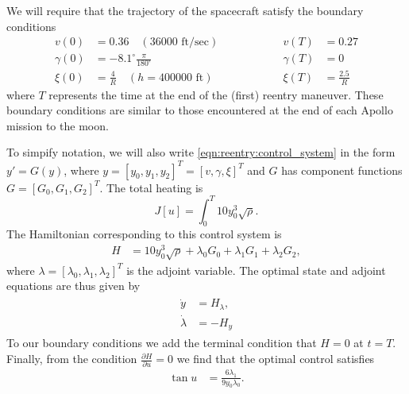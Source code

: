 We will require that the trajectory of the spacecraft satisfy the boundary conditions
\begin{equation}
  \begin{split}
    v(0) &= 0.36 \quad (36000 \text{ ft/sec})\\
    \gamma(0) &= -8.1^\circ \frac{\pi}{180^\circ}\\
    \xi(0)&= \frac{4}{R}\quad (h = 400000 \text{ ft})
  \end{split} 
\quad \quad \quad \quad \quad
  \begin{split}
    v(T) &= 0.27\\
    \gamma(T) &= 0 \\
	\xi(T)&= \frac{2.5}{R}
  \end{split} \label{eqn:reentry:BCs}
\end{equation}
where $T$ represents the time at the end of the (first) reentry maneuver. 
These boundary conditions are similar to those encountered at the end of each Apollo mission to the moon. 

To simpify notation, we will also write \eqref{eqn:reentry:control_system} in the form $y' = G(y)$, where $y = [y_0, y_1, y_2]^T=[v,\gamma, \xi]^T$ and $G$ has component functions $G = [G_0, G_1, G_2]^T$. 
The total heating is 
\[
J[u] = \int_0^T 10y_0^3 \sqrt{\rho}.
\]
The Hamiltonian corresponding to this control system is 
\begin{align}
H &=  10y_0^3 \sqrt{\rho} + \lambda_0G_0 + \lambda_1G_1 + \lambda_2G_2,
\end{align}
where $\lambda = [\lambda_0,\lambda_1,\lambda_2]^T$ is the adjoint variable. 
The optimal state and adjoint equations are thus given by 
\begin{align}
\begin{split}
	\dot{y} &= H_{\lambda},\\
	\dot{\lambda} &= -H_{y} \label{eqn:reentry:full_system}
\end{split}
\end{align}
To our boundary conditions we add the terminal condition that $H = 0$ at $t = T$. 
Finally, from the condition $\frac{\partial H}{\partial u} = 0$ we find that the optimal control satisfies 
\begin{align}
\tan u &= \frac{6\lambda_1}{9y_0\lambda_0}.
\end{align}

